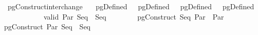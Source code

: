 \ pgConstruct{\isacharunderscore}interchange{\isacharcolon}\isanewline
\ \ \ {\isachardoublequoteopen}pgDefined\ \ \ {\isachardoublequoteopen}pgDefined\ \ \ {\isachardoublequoteopen}pgDefined\ \ \ {\isachardoublequoteopen}pgDefined\ \isanewline
\ \ \ \ \ \ \ \ \ \ \ {\isachardoublequoteopen}valid\ {\isacharparenleft}Par\ {\isacharparenleft}Seq\ \ {\isacharparenleft}Seq\ \isanewline
\ \ \ \ \ \ \ {\isachardoublequoteopen}pgConstruct\ {\isacharparenleft}Seq\ {\isacharparenleft}Par\ \ {\isacharparenleft}Par\ \ {\isasymapprox}\isanewline
{}pgConstruct\ {\isacharparenleft}Par\ {\isacharparenleft}Seq\ \ {\isacharparenleft}Seq\ 
